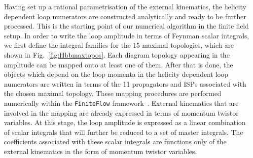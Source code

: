 \documentclass[main.tex]{subfiles}
\begin{document}
Having set up a rational parametrisation of the external kinematics, the helicity dependent loop numerators are constructed analytically and
ready to be further processed.
This is the starting point of our numerical algorithm in the finite field setup. 
In order to write the loop amplitude in terms of Feynman scalar integrals, 
we first define the integral families for the 15 maximal topologies, which are shown in Fig.~\ref{fig:Hbbmaxtopos}. 
Each diagram topology appearing in the amplitude can be mapped onto at least one of them. 
After that is done, the objects which depend on the loop momenta in the helicity dependent loop numerators are written in terms of 
the 11 propagators and ISPs associated with the chosen maximal topology. 
These mapping procedures are performed numerically within the \texttt{FiniteFlow} framework~\cite{Peraro:2019svx}. 
External kinematics that are involved in the mapping are already expressed in terms of momentum twistor variables.
At this stage, the loop amplitude is expressed as a linear combination of scalar integrals that will further be 
reduced to a set of master integrals. The coefficients associated with these scalar integrals are functions only of the external kinematics in the
form of momentum twistor variables.
\end{document}
